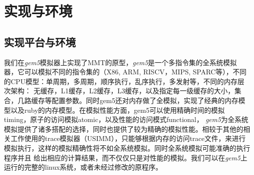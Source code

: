 \chapter{实现与环境}

\section{实现平台与环境}
我们在\emph{gem5}模拟器上实现了MMT的原型，\emph{gem5}是一个多指令集的全系统模拟器，它可以模拟不同的指令集的（X86, ARM, RISCV，MIPS, SPARC等），不同的CPU模型：单周期，多周期，顺序执行，乱序执行，多发射等，不同的内存层次架构：
无缓存，L1缓存，L2缓存，L3缓存，以及指定每一级缓存的大小，集合，几路缓存等配置参数。同时gem5还对内存做了全模拟，实现了经典的内存模型以及ruby的内存模型。在模拟性能方面，gem5可以使用精确时间的模拟timing，原子的访问模拟atomic，以及性能的访问模式functional，
\emph{gem5}为全系统模拟提供了诸多搭配的选择，同时也提供了较为精确的模拟性能。相较于其他的相关工作使用的trace模拟器（USIMM），只能够根据内存的访问trace文件，来进行模拟执行，这样的模拟精确性将不如全系统模拟。同时全系统模拟可能准确的执行程序并且
给出相应的计算结果，而不仅仅只是对性能的模拟。我们可以在\emph{gem5}上运行的完整的linux系统，或者未经过修改的原程序。
